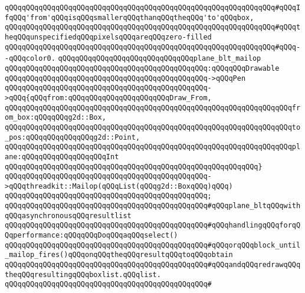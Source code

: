 \verb|qQQqqQQqqQQqqQQqqQQqqQQqqQQqqQQqqQQqqQQqqQQqqQQqqQQqqQQqqQQqqQQq#qQQqIfqQQq'from'qQQqisqQQqsmallerqQQqthanqQQqtheqQQq'to'qQQqbox,|\newline
\verb|qQQqqQQqqQQqqQQqqQQqqQQqqQQqqQQqqQQqqQQqqQQqqQQqqQQqqQQqqQQqqQQq#qQQqtheqQQqunspecifiedqQQqpixelsqQQqareqQQqzero-filled|\newline
\verb|qQQqqQQqqQQqqQQqqQQqqQQqqQQqqQQqqQQqqQQqqQQqqQQqqQQqqQQqqQQqqQQq#qQQq--qQQqcolor0.|\newline
\newline
\verb|qQQqqQQqqQQqqQQqqQQqqQQqqQQqqQQqplane_blt_mailop|\newline
\verb|qQQqqQQqqQQqqQQqqQQqqQQqqQQqqQQqqQQqqQQqqQQqqQQq:qQQqqQQqDrawable|\newline
\verb|qQQqqQQqqQQqqQQqqQQqqQQqqQQqqQQqqQQqqQQqqQQqqQQq->qQQqPen|\newline
\verb|qQQqqQQqqQQqqQQqqQQqqQQqqQQqqQQqqQQqqQQqqQQqqQQq->qQQq{qQQqfrom:qQQqqQQqqQQqqQQqqQQqqQQqDraw_From,|\newline
\verb|qQQqqQQqqQQqqQQqqQQqqQQqqQQqqQQqqQQqqQQqqQQqqQQqqQQqqQQqqQQqqQQqqQQqfrom_box:qQQqqQQqg2d::Box,|\newline
\verb|qQQqqQQqqQQqqQQqqQQqqQQqqQQqqQQqqQQqqQQqqQQqqQQqqQQqqQQqqQQqqQQqqQQqto_pos:qQQqqQQqqQQqqQQqg2d::Point,|\newline
\verb|qQQqqQQqqQQqqQQqqQQqqQQqqQQqqQQqqQQqqQQqqQQqqQQqqQQqqQQqqQQqqQQqqQQqplane:qQQqqQQqqQQqqQQqqQQqInt|\newline
\verb|qQQqqQQqqQQqqQQqqQQqqQQqqQQqqQQqqQQqqQQqqQQqqQQqqQQqqQQqqQQq}|\newline
\verb|qQQqqQQqqQQqqQQqqQQqqQQqqQQqqQQqqQQqqQQqqQQqqQQq->qQQqthreadkit::Mailop(qQQqList(qQQqg2d::BoxqQQq)qQQq)|\newline
\verb|qQQqqQQqqQQqqQQqqQQqqQQqqQQqqQQqqQQqqQQqqQQqqQQq;|\newline
\verb|qQQqqQQqqQQqqQQqqQQqqQQqqQQqqQQqqQQqqQQqqQQqqQQq#qQQqplane_bltqQQqwithqQQqasynchronousqQQqresultlist|\newline
\verb|qQQqqQQqqQQqqQQqqQQqqQQqqQQqqQQqqQQqqQQqqQQqqQQq#qQQqhandlingqQQqforqQQqperformance:qQQqqQQqDoqQQqaqQQqselect()|\newline
\verb|qQQqqQQqqQQqqQQqqQQqqQQqqQQqqQQqqQQqqQQqqQQqqQQq#qQQqorqQQqblock_until_mailop_fires()qQQqonqQQqtheqQQqresultqQQqtoqQQqobtain|\newline
\verb|qQQqqQQqqQQqqQQqqQQqqQQqqQQqqQQqqQQqqQQqqQQqqQQq#qQQqandqQQqredrawqQQqtheqQQqresultingqQQqboxlist.qQQqlist.|\newline
\verb|qQQqqQQqqQQqqQQqqQQqqQQqqQQqqQQqqQQqqQQqqQQqqQQq#|\newline
